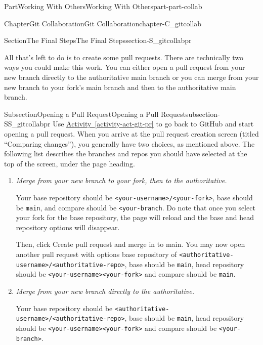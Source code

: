 \documentclass[oneside,10pt,]{book}
\newcommand{\xreffont}{\relax}
\newcommand{\mono}[1]{\texttt{#1}}
\newcommand{\lititle}[1]{{\slshape#1}}
\begin{document}
\begin{partptx}{Part}{Working With Others}{}{Working With Others}{}{}{part-part-collab}
\begin{chapterptx}{Chapter}{Git Collaboration}{}{Git Collaboration}{}{}{chapter-C_gitcollab}
%
\begin{sectionptx}{Section}{The Final Steps}{}{The Final Steps}{}{}{section-S_gitcollabpr}
\begin{introduction}{}%
All that's left to do is to create some pull requests. There are technically two ways you could make this work. You can either open a pull request from your new branch directly to the authoritative main branch or you can merge from your new branch to your fork's main branch and then to the authoritative main branch.%
\end{introduction}%
%
%
\typeout{************************************************}
\typeout{************************************************}
%
\begin{subsectionptx}{Subsection}{Opening a Pull Request}{}{Opening a Pull Request}{}{}{subsection-SS_gitcollabpr}
%
%
%
%
%
%
Use \hyperref[activity-act-git-pr]{Activity~{\xreffont\ref{activity-act-git-pr}}} to go back to GitHub and start opening a pull request. When you arrive at the pull request creation screen (titled ``Comparing changes''), you generally have two choices, as mentioned above. The following list describes the branches and repos you should have selected at the top of the screen, under the page heading.%
\begin{enumerate}
\item{}\lititle{Merge from your new branch to your fork, then to the authoritative.}\par%
Your base repository should be \mono{<your-username>/<your-fork>}, base should be \mono{main}, and compare should be \mono{<your-branch}. Do note that once you select your fork for the base repository, the page will reload and the base and head repository options will disappear.%
\par
Then, click Create pull request and merge in to main. You may now open another pull request with options base repository of \mono{<authoritative-username>/<authoritative-repo>}, base should be \mono{main}, head repository should be \mono{<your-username><your-fork>} and compare should be \mono{main}.%
\item{}\lititle{Merge from your new branch directly to the authoritative.}\par%
Your base repository should be \mono{<authoritative-username>/<authoritative-repo>}, base should be \mono{main}, head repository should be \mono{<your-username><your-fork>} and compare should be \mono{<your-branch>}.%

\end{enumerate}
\end{subsectionptx}
\end{sectionptx}
\end{chapterptx}
\end{partptx}
\end{document}
